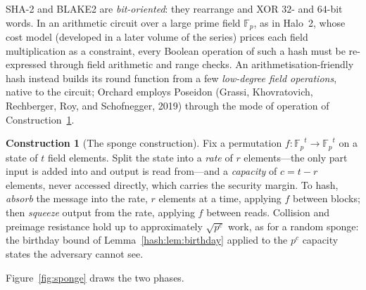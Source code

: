 \documentclass[11pt,a4paper]{article}
\theoremstyle{definition}
\newtheorem{construction}[theorem]{Construction}
\theoremstyle{remark}
\newcommand{\Fp}{\ensuremath{\mathbb{F}_{p}}}
\begin{document}
SHA-2 and BLAKE2 are \emph{bit-oriented}: they rearrange and XOR
\(32\)- and \(64\)-bit words. In an arithmetic circuit over a large
prime field \(\Fp\), as in Halo~2, whose cost model (developed in a
later volume of the series) prices each field multiplication as a
constraint, every Boolean operation of such a hash must be
re-expressed through field arithmetic and range checks. An
arithmetisation-friendly hash instead builds its round function from a
few \emph{low-degree field operations}, native to the circuit; Orchard
employs Poseidon (Grassi, Khovratovich, Rechberger, Roy, and
Schofnegger, 2019) through the mode of operation of
Construction~\ref{hash:con:sponge}.

\begin{construction}[The sponge construction]\label{hash:con:sponge}
Fix a permutation \(f \colon \Fp^{t} \to \Fp^{t}\) on a state of
\(t\) field elements. Split the state into a \emph{rate} of \(r\)
elements---the only part input is added into and output is read
from---and a \emph{capacity} of \(c = t - r\) elements, never
accessed directly, which carries the security margin. To hash, \emph{absorb} the
message into the rate, \(r\) elements at a time, applying \(f\)
between blocks; then \emph{squeeze} output from the rate, applying
\(f\) between reads. Collision and preimage resistance hold up to
approximately \(\sqrt{p^{c}}\) work, as for a random sponge: the
birthday bound of Lemma~\ref{hash:lem:birthday} applied to the
\(p^{c}\) capacity states the adversary cannot see.
\end{construction}

Figure~\ref{fig:sponge} draws the two phases.
\end{document}
